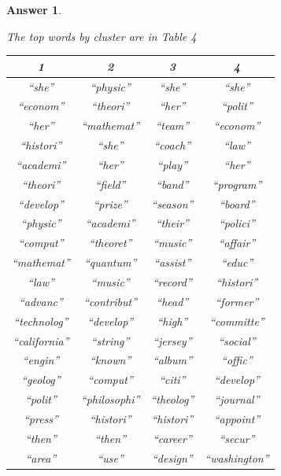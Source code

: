 \documentclass[12pt]{article}
\theoremstyle{colon}
\newtheorem*{answer}{Answer}
\begin{document}
\begin{answer}
\begin{enumerate}[label=\arabic*)]
      \clearpage

      The top words by cluster are in Table 4
      \begin{center}
        \begin{tabular}{ c | c | c | c }
          1 & 2 & 3 & 4 \\
          \hline
          ``she''       & ``physic''    & ``she''    & ``she''        \\
          ``econom''    & ``theori''    & ``her''    & ``polit''      \\
          ``her''       & ``mathemat''  & ``team''   & ``econom''     \\
          ``histori''   & ``she''       & ``coach''  & ``law''        \\
          ``academi''   & ``her''       & ``play''   & ``her''        \\
          ``theori''    & ``field''     & ``band''   & ``program''    \\
          ``develop''   & ``prize''     & ``season'' & ``board''      \\
          ``physic''    & ``academi''   & ``their''  & ``polici''     \\
          ``comput''    & ``theoret''   & ``music''  & ``affair''     \\
          ``mathemat''  & ``quantum''   & ``assist'' & ``educ''       \\
          ``law''       & ``music''     & ``record'' & ``histori''    \\
          ``advanc''    & ``contribut'' & ``head''   & ``former''     \\
          ``technolog'' & ``develop''   & ``high''   & ``committe''   \\
          ``california''& ``string''    & ``jersey'' & ``social''     \\
          ``engin''     & ``known''     & ``album''  & ``offic''      \\
          ``geolog''    & ``comput''    & ``citi''   & ``develop''    \\
          ``polit''     & ``philosophi''& ``theolog''& ``journal''    \\
          ``press''     & ``histori''   & ``histori''& ``appoint''    \\
          ``then''      & ``then''      & ``career'' & ``secur''      \\
          ``area''      & ``use''       & ``design'' & ``washington'' \\

\end{tabular}
\end{center}
\end{enumerate}
\end{answer}
\end{document}
